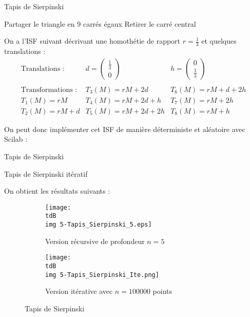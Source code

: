 			\begin{algorithm}[H]
			\DontPrintSemicolon
			\caption{Tapis de Sierpinski}
				{
					Partager le triangle en 9 carrés égaux\;
					Retirer le carré central\;
				}
			\end{algorithm}

			On a l'ISF suivant décrivant une homothétie de rapport $r=\frac{1}{3}$ et quelques translations :
			\begin{equation}
				\begin{array}{lll}
					\label{eq-2-isfTapisSierpinski}
					\text{Translations :}
					& d = \begin{pmatrix} \frac{1}{3}	\\ 0				\end{pmatrix}
					& h = \begin{pmatrix} 0				\\ \frac{1}{3}		\end{pmatrix}
					\\
					\\
					\text{Transformations :}
					& T_3(M) = rM + 2d
					& T_6(M) = rM + d + 2h
					\\
					T_1(M) = rM
					& T_4(M) = rM + 2d + h
					& T_7(M) = rM + 2h
					\\
					T_2(M) = rM + d
					& T_5(M) = rM + 2d + 2h
					& T_8(M) = rM + h
				\end{array}	
			\end{equation}

			On peut donc implémenter cet ISF de manière déterministe et aléatoire avec Scilab :

			\begin{listing}[H]
				\caption{Tapis de Sierpinski}
				\label{code-2-tapisSierpinskiRecursif}
			\end{listing}
			\begin{listing}[H]
				\caption{Tapis de Sierpinski itératif}
				\label{code-2-tapisSierpinskiIteratif}
			\end{listing}

			On obtient les résultats suivants :
			\begin{figure}[H]		
				\centering
				\begin{subfigure}{.45\textwidth}
					\centering
					\texttt{[image: \\tdB\\img 5-Tapis\_Sierpinski\_5.eps]}
					\caption{Version récursive de profondeur $n=5$}
					\label{img-2-tapisSierpinskiRecursif}
				\end{subfigure}
				\begin{subfigure}{.45\textwidth}
					\centering
					\texttt{[image: \\tdB\\img 5-Tapis\_Sierpinski\_Ite.png]}
					\caption{Version itérative avec $n=100000$ points}
					\label{img-2-tapisSierpinskiIteratif}
				\end{subfigure}
				\caption{Tapis de Sierpinski}
				\label{img-2-tapisSierpinski}
			\end{figure}


